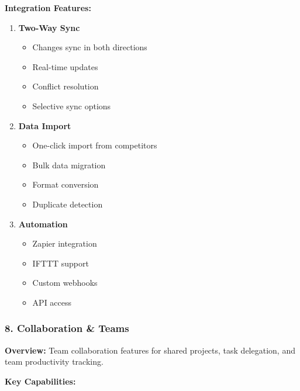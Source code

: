 \textbf{Integration Features:}

\begin{enumerate}
    \item \textbf{Two-Way Sync}
    \begin{itemize}
        \item Changes sync in both directions
        \item Real-time updates
        \item Conflict resolution
        \item Selective sync options
    \end{itemize}
    
    \item \textbf{Data Import}
    \begin{itemize}
        \item One-click import from competitors
        \item Bulk data migration
        \item Format conversion
        \item Duplicate detection
    \end{itemize}
    
    \item \textbf{Automation}
    \begin{itemize}
        \item Zapier integration
        \item IFTTT support
        \item Custom webhooks
        \item API access
    \end{itemize}
\end{enumerate}

\subsubsection{8. Collaboration \& Teams}

\textbf{Overview:}
Team collaboration features for shared projects, task delegation, and team productivity tracking.

\textbf{Key Capabilities:}

